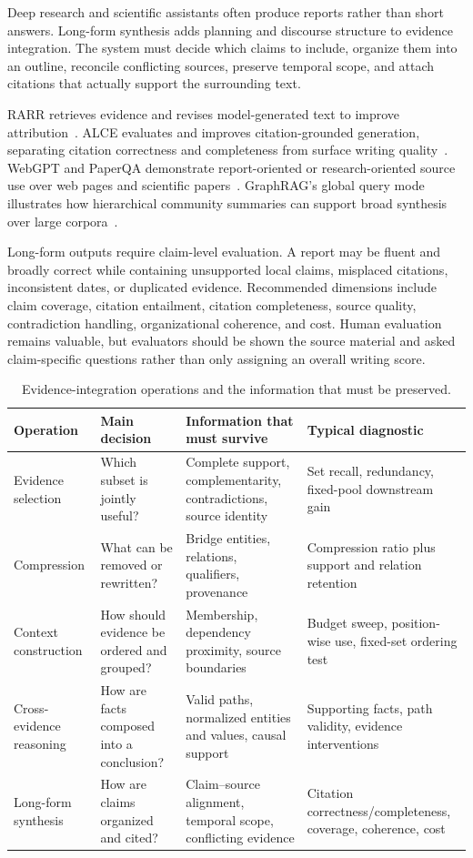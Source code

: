 Deep research and scientific assistants often produce reports rather than short answers. Long-form synthesis adds planning and discourse structure to evidence integration. The system must decide which claims to include, organize them into an outline, reconcile conflicting sources, preserve temporal scope, and attach citations that actually support the surrounding text.

RARR retrieves evidence and revises model-generated text to improve attribution~\cite{gao2023rarr}. ALCE evaluates and improves citation-grounded generation, separating citation correctness and completeness from surface writing quality~\cite{gao2023alce}. WebGPT and PaperQA demonstrate report-oriented or research-oriented source use over web pages and scientific papers~\cite{nakano2021webgpt,lala2023paperqa}. GraphRAG's global query mode illustrates how hierarchical community summaries can support broad synthesis over large corpora~\cite{edge2024graphrag}.

Long-form outputs require claim-level evaluation. A report may be fluent and broadly correct while containing unsupported local claims, misplaced citations, inconsistent dates, or duplicated evidence. Recommended dimensions include claim coverage, citation entailment, citation completeness, source quality, contradiction handling, organizational coherence, and cost. Human evaluation remains valuable, but evaluators should be shown the source material and asked claim-specific questions rather than only assigning an overall writing score.

\begin{table}[tbp]
\centering
\caption{Evidence-integration operations and the information that must be preserved.}
\label{tab:evidence_integration_operations}
\small
\begin{tabularx}{\textwidth}{@{}p{2.7cm}p{3.0cm}Y Y@{}}
\toprule
Operation & Main decision & Information that must survive & Typical diagnostic \\
\midrule
Evidence selection & Which subset is jointly useful? & Complete support, complementarity, contradictions, source identity & Set recall, redundancy, fixed-pool downstream gain \\
Compression & What can be removed or rewritten? & Bridge entities, relations, qualifiers, provenance & Compression ratio plus support and relation retention \\
Context construction & How should evidence be ordered and grouped? & Membership, dependency proximity, source boundaries & Budget sweep, position-wise use, fixed-set ordering test \\
Cross-evidence reasoning & How are facts composed into a conclusion? & Valid paths, normalized entities and values, causal support & Supporting facts, path validity, evidence interventions \\
Long-form synthesis & How are claims organized and cited? & Claim--source alignment, temporal scope, conflicting evidence & Citation correctness/completeness, coverage, coherence, cost \\
\bottomrule
\end{tabularx}
\end{table}

